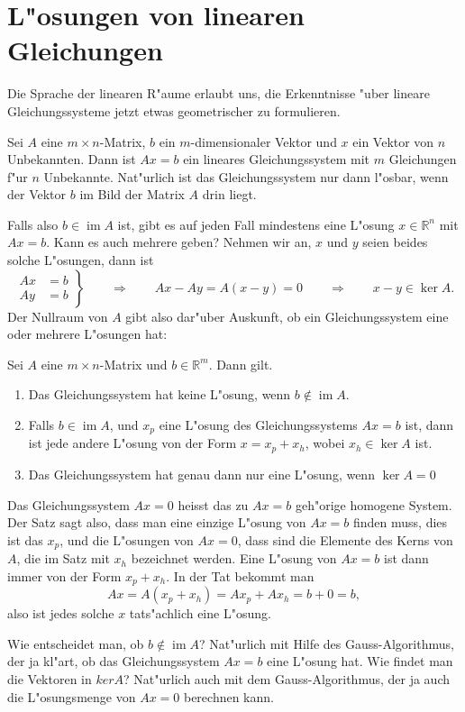 \section{L"osungen von linearen Gleichungen}
Die Sprache der linearen R"aume erlaubt uns, die Erkenntnisse "uber
lineare Gleichungssysteme jetzt etwas geometrischer zu formulieren.

Sei $A$ eine $m\times n$-Matrix, $b$ ein $m$-dimensionaler Vektor und $x$
ein Vektor von $n$ Unbekannten. Dann ist $Ax=b$ ein lineares Gleichungssystem
mit $m$ Gleichungen f"ur $n$ Unbekannte. Nat"urlich ist das Gleichungssystem
nur dann l"osbar, wenn der Vektor $b$ im Bild der Matrix $A$ drin liegt.

Falls also $b\in\operatorname{im}A$ ist, gibt es auf jeden Fall mindestens
eine L"osung $x\in\mathbb R^n$ mit $Ax=b$. Kann es auch mehrere geben? Nehmen
wir an, $x$ und $y$ seien beides solche L"osungen, dann ist
\[
\left.
\begin{aligned}
Ax&=b\\
Ay&=b
\end{aligned}
\right\}
\qquad\Rightarrow\qquad
Ax-Ay=A(x-y)=0
\qquad\Rightarrow\qquad
x-y\in\operatorname{ker}A.
\]
Der Nullraum von $A$ gibt also dar"uber Auskunft, ob ein Gleichungssystem
eine oder mehrere L"osungen hat:
\begin{satz}
Sei $A$ eine $m\times n$-Matrix und $b\in\mathbb R^m$. Dann gilt.
\begin{enumerate}
\item Das Gleichungssystem hat keine L"osung, wenn $b\not\in \operatorname{im}A$.
\item Falls $b\in\operatorname{im}A$, und $x_p$ eine L"osung des Gleichungssystems
$Ax=b$ ist, dann ist jede andere L"osung von der Form $x=x_p+x_h$, wobei
$x_h\in\operatorname{ker}A$ ist.
\item Das Gleichungssystem hat genau dann nur eine L"osung, wenn $\operatorname{ker}A=0$
\end{enumerate}
\end{satz}
Das Gleichungssystem $Ax=0$ heisst das zu $Ax=b$ geh"orige homogene System.
Der Satz sagt also, dass man eine einzige L"osung von $Ax=b$ finden muss,
dies ist das $x_p$, und die L"osungen von $Ax=0$, dass sind die Elemente
des Kerns von $A$, die im Satz mit $x_h$ bezeichnet werden. Eine L"osung
von $Ax=b$ ist dann immer von der Form $x_p+x_h$. In der Tat bekommt
man 
\[
Ax=A(x_p+x_h)=Ax_p+Ax_h=b+0=b,
\]
also ist jedes solche $x$ tats"achlich eine L"osung.

Wie entscheidet man, ob $b\not\in\operatorname{im}A$? Nat"urlich mit
Hilfe des Gauss-Algorithmus, der ja kl"art, ob das Gleichungssystem
$Ax=b$ eine L"osung hat. Wie findet man die Vektoren in $ker A$?
Nat"urlich auch mit dem Gauss-Algorithmus, der ja auch die L"osungsmenge
von $Ax=0$ berechnen kann.

